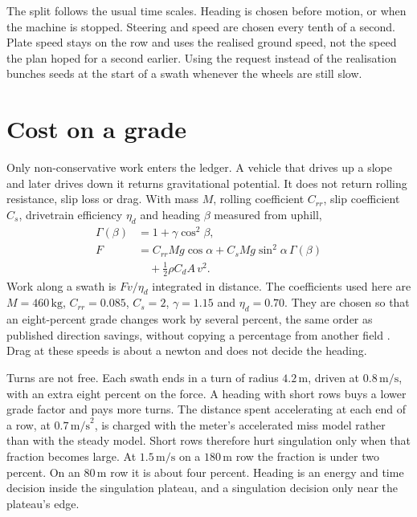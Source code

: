 \documentclass[11pt,a4paper]{article}
\begin{document}
The split follows the usual time scales. Heading is chosen before motion, or when the machine is stopped. Steering and speed are chosen every tenth of a second. Plate speed stays on the row and uses the realised ground speed, not the speed the plan hoped for a second earlier. Using the request instead of the realisation bunches seeds at the start of a swath whenever the wheels are still slow.

\section{Cost on a grade}
Only non-conservative work enters the ledger. A vehicle that drives up a slope and later drives down it returns gravitational potential. It does not return rolling resistance, slip loss or drag. With mass \(M\), rolling coefficient \(C_{rr}\), slip coefficient \(C_s\), drivetrain efficiency \(\eta_d\) and heading \(\beta\) measured from uphill,
\begin{equation}
\label{eq:work}
\begin{aligned}
\Gamma(\beta)&=1+\gamma\cos^2\beta,\\
F&=C_{rr}Mg\cos\alpha+C_s Mg\sin^2\alpha\,\Gamma(\beta)\\
&\quad+\tfrac12\rho C_dA\,v^2.
\end{aligned}
\end{equation}
Work along a swath is \(F v/\eta_d\) integrated in distance. The coefficients used here are \(M=460\,\mathrm{kg}\), \(C_{rr}=0.085\), \(C_s=2\), \(\gamma=1.15\) and \(\eta_d=0.70\). They are chosen so that an eight-percent grade changes work by several percent, the same order as published direction savings, without copying a percentage from another field \cite{vahdanjoo2023}. Drag at these speeds is about a newton and does not decide the heading.

Turns are not free. Each swath ends in a turn of radius \(4.2\,\mathrm{m}\), driven at \(0.8\,\mathrm{m/s}\), with an extra eight percent on the force. A heading with short rows buys a lower grade factor and pays more turns. The distance spent accelerating at each end of a row, at \(0.7\,\mathrm{m/s}^2\), is charged with the meter's accelerated miss model rather than with the steady model. Short rows therefore hurt singulation only when that fraction becomes large. At \(1.5\,\mathrm{m/s}\) on a \(180\,\mathrm{m}\) row the fraction is under two percent. On an \(80\,\mathrm{m}\) row it is about four percent. Heading is an energy and time decision inside the singulation plateau, and a singulation decision only near the plateau's edge.
\end{document}
